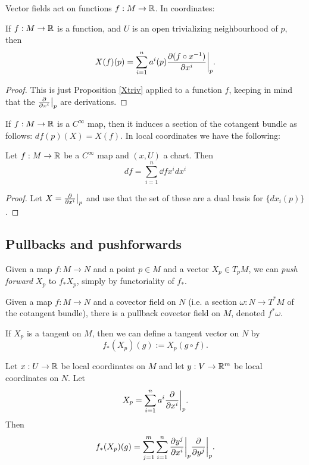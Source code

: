 \documentclass[11pt, english]{article}
\begin{document}
Vector fields act on functions $f:M \to \mathbb{R}$. In coordinates:
\begin{prop}
\label{Xftriv}
If $f:M \to \mathbb{R}$ is a function, and $U$ is an open trivializing neighbourhood of $p$, then
\[
X(f)(p) = \sum_{i=1}^n a^i(p)\restr{\dd{(f \circ x^{-1})}{x^i}}{p}.
\]
\end{prop}
\begin{proof}
This is just Proposition \ref{Xtriv} applied to a function $f$, keeping in mind that the $\restr{\dd{}{x^i}}{p}$ are derivations.
\end{proof}

If $f:M \to \mathbb{R}$ is a $C^\infty$ map, then it induces a section of the cotangent bundle as follows: $df(p)(X)=X(f)$. In local coordinates we have the following:
\begin{prop}
\label{df}
Let $f:M \to \mathbb{R}$ be a $C^\infty$ map and $(x,U)$ a chart. Then
\[
df = \sum_{i=1}^n \dd{f}{x^i} dx^i
\]
\end{prop}
\begin{proof}
Let $X = \restr{\dd{}{x^i}}{p}$ and use that the set of these are a dual basis for $\{ dx_i(p) \}$.
\end{proof}

\subsection{Pullbacks and pushforwards}

Given a map $f:M \to N$ and a point $p \in M$ and a vector $X_p \in T_pM$, we can \emph{push forward} $X_p$ to $f_\ast X_p$, simply by functoriality of $f_\ast$. 

Given a map $f:M \to N$ and a covector field on $N$ (i.e. a section $\omega:N \to T^\ast M$ of the cotangent bundle), there is a pullback covector field on $M$, denoted $f^\ast \omega$.

\begin{defi}
If $X_p$ is a tangent on $M$, then we can define a tangent vector on $N$ by 
\[
f_\ast (X_p)(g) := X_p(g \circ f).
\]
\end{defi}

\begin{defi}
Let $x:U \to \mathbb{R}$ be local coordinates on $M$ and let $y:V \to \mathbb{R}^m$ be local coordinates on $N$. Let
\[
X_p = \sum_{i=1}^n a^i \restr{\dd{}{x^i}}{p}.
\]
Then
\[
f_\ast(X_p)(g) = \sum_{j=1}^m \sum_{i=1}^n \restr{\dd{y^j}{x^i}}{p} \restr{\dd{}{y^j}}{p}.
\]
\end{defi}
\end{document}
